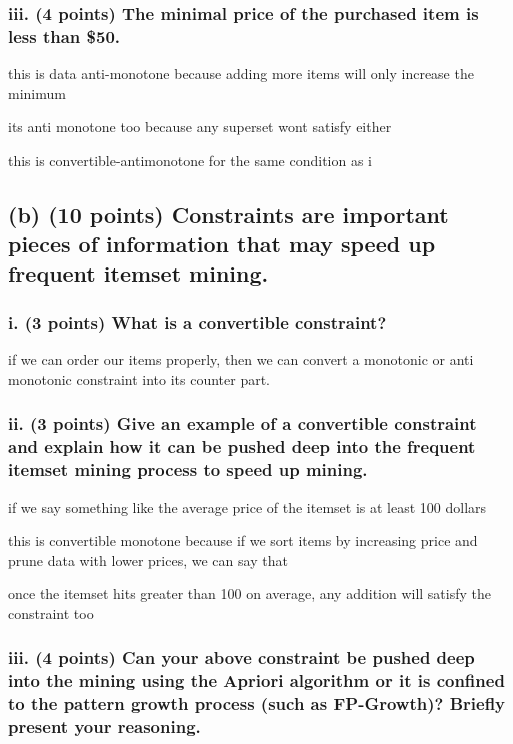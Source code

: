 \documentclass[
]{article}
\begin{document}
\subsubsection{iii. (4 points) The minimal price of the purchased item
is less than
\$50.}\label{iii.-4-points-the-minimal-price-of-the-purchased-item-is-less-than-50.}

this is data anti-monotone because adding more items will only increase
the minimum

its anti monotone too because any superset wont satisfy either

this is convertible-antimonotone for the same condition as i

\subsection{(b) (10 points) Constraints are important pieces of
information that may speed up frequent itemset
mining.}\label{b-10-points-constraints-are-important-pieces-of-information-that-may-speed-up-frequent-itemset-mining.}

\subsubsection{i. (3 points) What is a convertible
constraint?}\label{i.-3-points-what-is-a-convertible-constraint}

if we can order our items properly, then we can convert a monotonic or
anti monotonic constraint into its counter part.

\subsubsection{ii. (3 points) Give an example of a convertible
constraint and explain how it can be pushed deep into the frequent
itemset mining process to speed up
mining.}\label{ii.-3-points-give-an-example-of-a-convertible-constraint-and-explain-how-it-can-be-pushed-deep-into-the-frequent-itemset-mining-process-to-speed-up-mining.}

if we say something like the average price of the itemset is at least
100 dollars

this is convertible monotone because if we sort items by increasing
price and prune data with lower prices, we can say that

once the itemset hits greater than 100 on average, any addition will
satisfy the constraint too

\subsubsection{iii. (4 points) Can your above constraint be pushed deep
into the mining using the Apriori algorithm or it is confined to the
pattern growth process (such as FP-Growth)? Briefly present your
reasoning.}\label{iii.-4-points-can-your-above-constraint-be-pushed-deep-into-the-mining-using-the-apriori-algorithm-or-it-is-confined-to-the-pattern-growth-process-such-as-fp-growth-briefly-present-your-reasoning.}
\end{document}

